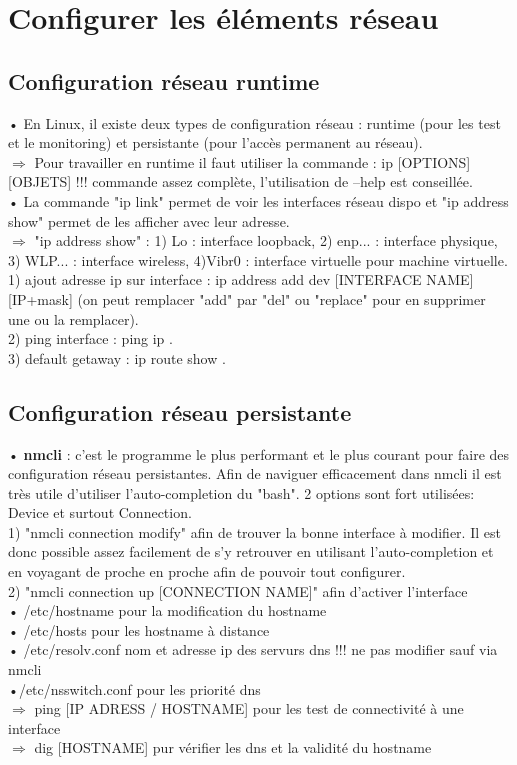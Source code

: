 \documentclass[a4paper, 11pt, french, oneside]{book}
\begin{document}
	\chapter{Configurer les éléments réseau}
		\section{Configuration réseau runtime}
			• En Linux, il existe deux types de configuration réseau : runtime (pour les test et le monitoring) et persistante (pour l'accès permanent au réseau).\\
			$\Rightarrow$ Pour travailler en runtime il faut utiliser la commande : ip [OPTIONS][OBJETS] !!! commande assez complète, l'utilisation de --help est conseillée. \\
			• La commande "ip link" permet de voir les interfaces réseau dispo et "ip address show" permet de les afficher avec leur adresse.\\
			$\Rightarrow$ "ip address show" : 1) Lo : interface  loopback, 2) enp... : interface physique, 3) WLP... : interface wireless, 4)Vibr0 : interface virtuelle pour machine virtuelle. \\
		  	1) ajout adresse ip sur interface : ip address add dev [INTERFACE NAME] [IP+mask] (on peut remplacer "add" par "del" ou "replace" pour en supprimer une ou la remplacer).\\
		 	2) ping interface : ping ip .\\
		 	3) default getaway : ip route show .\\
		\section{Configuration réseau persistante}
			• \textbf{nmcli}  : c'est le programme le plus performant et le plus courant pour faire des configuration réseau persistantes. Afin de naviguer efficacement dans nmcli il est très utile d'utiliser l'auto-completion du "bash". 2 options sont fort utilisées: Device et surtout Connection. \\
			1) "nmcli connection modify" afin de trouver la bonne interface à modifier. Il est donc possible assez facilement de s'y retrouver en utilisant l'auto-completion et en voyagant de proche en proche afin de pouvoir tout configurer.\\
			2) "nmcli connection up [CONNECTION NAME]" afin d'activer l'interface\\
			• /etc/hostname pour la modification du hostname \\
		    • /etc/hosts pour les hostname à distance\\
		    • /etc/resolv.conf nom et adresse ip des servurs dns !!! ne pas modifier sauf via nmcli\\
		    •/etc/nsswitch.conf pour les priorité dns\\ 
			$\Rightarrow$ ping [IP ADRESS / HOSTNAME] pour les test de connectivité à une interface \\
			$\Rightarrow$  dig [HOSTNAME] pur vérifier les dns et la validité du hostname\\
			
\end{document}
